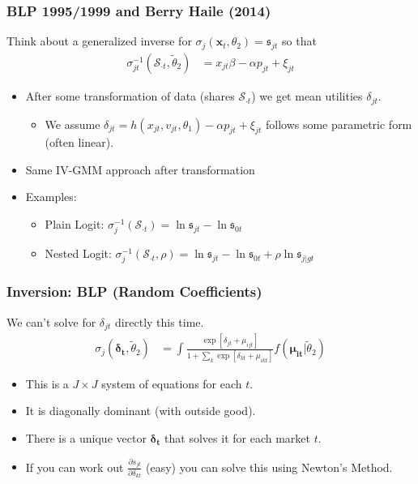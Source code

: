 \documentclass[xcolor=pdftex,dvipsnames,table,mathserif,aspectratio=169]{beamer}
\begin{document}
\begin{frame}
\frametitle{BLP 1995/1999 and Berry Haile (2014)}
Think about a \alert{generalized inverse} for $\sigma_{j}(\mathbf{x}_t,\theta_2) = \mathfrak{s}_{jt}$ so that 
\begin{align*}
 \sigma_{jt}^{-1}(\mathcal{S}_{\cdot t},\widetilde{\theta}_2)&= x_{jt} \beta -\alpha p_{jt} +  \xi_{jt} 
\end{align*}
 \begin{itemize}
\item After some transformation of data (shares $\mathcal{S}_{\cdot t}$) we get \alert{mean utilities} $\delta_{jt}$.
\begin{itemize}
\item We assume $\delta_{jt}=h(x_{jt},v_{jt},\theta_1) -\alpha p_{jt} + \xi_{jt}$ follows some parametric form (often linear).
 \end{itemize}
\item Same IV-GMM approach after transformation
\item Examples:
\begin{itemize}
\item Plain Logit: $\sigma_{j}^{-1}(\mathcal{S}_{\cdot t}) = \ln \mathfrak{s}_{jt}- \ln \mathfrak{s}_{0t}$
\item Nested Logit: $\sigma_{j}^{-1}(\mathcal{S}_{\cdot t},\rho) = \ln \mathfrak{s}_{jt}- \ln \mathfrak{s}_{0t} + \rho  \ln \mathfrak{s}_{j|gt}$
 \end{itemize}
 \end{itemize}
\end{frame}


\begin{frame}
\frametitle{Inversion: BLP (Random Coefficients)}
We can't solve for $\delta_{jt}$ directly this time.
\begin{align*}
\sigma_{j}(\boldsymbol{\delta_{t}},\widetilde{\theta}_2) &= \int \frac{\exp[\delta_{jt} + \mu_{ijt} ]}{1+\sum_k \exp[\delta_{kt} +  \mu_{ikt}  ]} f(\boldsymbol{\mu_{it}} | \widetilde{\theta}_2)
\end{align*}
 \begin{itemize}
 \item This is a $J \times J$ system of equations for each $t$.
 \item It is diagonally dominant (with outside good).
 \item There is a unique vector $\boldsymbol{\delta_{t}}$ that solves it for each market $t$.
 \item If you can work out $\frac{\partial s_{jt}}{\partial \delta_{kt}}$ (easy) you can solve this using Newton's Method.
 \end{itemize}
\end{frame}
\end{document}
